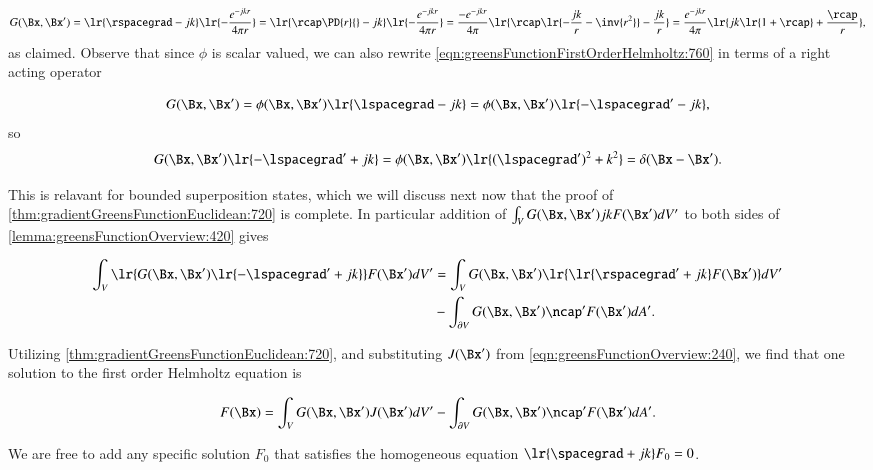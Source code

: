 \begin{dmath}\label{eqn:greensFunctionFirstOrderHelmholtz:780}
G(\Bx, \Bx')
=
\lr{ \rspacegrad - j k } \lr{ -\frac{e^{-j k r}}{4 \pi r} }
=
\lr{ \rcap \PD{r}{} -j k } \lr{ -\frac{e^{-j k r}}{4 \pi r} }
=
\frac{-e^{-j k r}}{4 \pi}
\lr{
\rcap \lr{ -\frac{j k}{r} - \inv{ r^2 } } - \frac{j k}{r}
}
=
\frac{e^{-j k r}}{4 \pi}
\lr{
j k \lr{ 1 + \rcap } + \frac{\rcap}{r}
},
\end{dmath}
as claimed.
Observe that since \( \phi \) is scalar valued, we can also rewrite
\cref{eqn:greensFunctionFirstOrderHelmholtz:760} in terms of a right acting operator

\begin{dmath}\label{eqn:greensFunctionFirstOrderHelmholtz:800}
G(\Bx, \Bx')
=
\phi(\Bx, \Bx')
\lr{ \lspacegrad - j k }
=
\phi(\Bx, \Bx')
\lr{ -\lspacegrad' - j k },
\end{dmath}
so
\begin{equation}\label{eqn:greensFunctionFirstOrderHelmholtz:820}
G(\Bx, \Bx') \lr{ -\lspacegrad' + j k } =
\phi(\Bx, \Bx') \lr{ (\lspacegrad')^2 + k^2 }
=
\delta(\Bx - \Bx').
\end{equation}

This is relavant for bounded superposition states, which we will discuss next now that the proof of
\cref{thm:gradientGreensFunctionEuclidean:720} is complete.
In particular addition of
\( \int_V G(\Bx, \Bx') j k F(\Bx') dV' \) to both sides of \cref{lemma:greensFunctionOverview:420} gives

\begin{dmath}\label{eqn:greensFunctionFirstOrderHelmholtz:860}
\begin{aligned}
\int_V \lr{ G(\Bx, \Bx') \lr{ -\lspacegrad' + j k } } F(\Bx') dV'
&=
\int_V G(\Bx, \Bx') \lr{ \lr{ \rspacegrad' + j k } F(\Bx') } dV' \\
&-
\int_{\partial V} G(\Bx, \Bx') \ncap' F(\Bx') dA'.
\end{aligned}
\end{dmath}

Utilizing \cref{thm:gradientGreensFunctionEuclidean:720}, and substituting \( J(\Bx') \)
from \cref{eqn:greensFunctionOverview:240},
we find that one solution to the first order Helmholtz equation is

\begin{dmath}\label{eqn:greensFunctionFirstOrderHelmholtz:880}
F(\Bx)
=
\int_V G(\Bx, \Bx') J(\Bx') dV'
-
\int_{\partial V} G(\Bx, \Bx') \ncap' F(\Bx') dA'.
\end{dmath}

We are free to
add any specific solution \( F_0 \) that satisfies the homogeneous equation \( \lr{ \spacegrad + j k } F_0 = 0 \).
